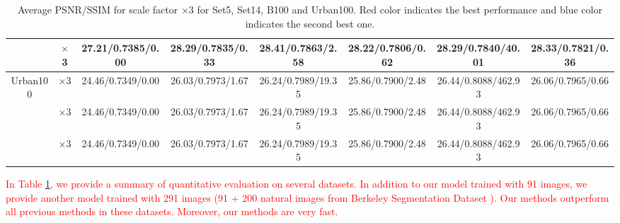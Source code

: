 \documentclass[10pt,twocolumn,letterpaper]{article}
\begin{document}
\begin{table}
\begin{center}
\begin{tabular}{ | c | c | c | c | c | c | c | c | }
 & $\times$3 & 27.21/0.7385/0.00 & 28.29/0.7835/0.33 & {\color{red}28.41}/{\color{red}0.7863}/2.58 & 28.22/0.7806/0.62 & 28.29/{\color{blue}0.7840}/40.01 & {\color{blue}28.33}/0.7821/0.36\\
\hline
\hline
\multirow{3}{*}{Urban100} & $\times$3 & 24.46/0.7349/0.00 & 26.03/0.7973/1.67 & {\color{blue}26.24}/{\color{blue}0.7989}/19.35 & 25.86/0.7900/2.48 & {\color{red}26.44}/{\color{red}0.8088}/462.93 & 26.06/0.7965/0.66\\
 & $\times$3 & 24.46/0.7349/0.00 & 26.03/0.7973/1.67 & {\color{blue}26.24}/{\color{blue}0.7989}/19.35 & 25.86/0.7900/2.48 & {\color{red}26.44}/{\color{red}0.8088}/462.93 & 26.06/0.7965/0.66\\
 & $\times$3 & 24.46/0.7349/0.00 & 26.03/0.7973/1.67 & {\color{blue}26.24}/{\color{blue}0.7989}/19.35 & 25.86/0.7900/2.48 & {\color{red}26.44}/{\color{red}0.8088}/462.93 & 26.06/0.7965/0.66\\
\hline
\end{tabular}
\caption{Average PSNR/SSIM for scale factor $\times$3 for Set5, Set14, B100 and Urban100. {\color{red}Red color} indicates the best performance and {\color{blue}blue color} indicates the second best one.} \label{table_all}
\end{center}
\end{table}


\textcolor{red}{
In Table \ref{table_all}, we provide a summary of quantitative evaluation on several datasets. In addition to our model trained with 91 images, we provide another model trained with 291 images (91 + 200 natural images from Berkeley Segmentation Dataset \cite{Martin2001}).
Our methods outperform all previous methods in these datasets. Moreover, our methods are very fast. }
\end{document}
